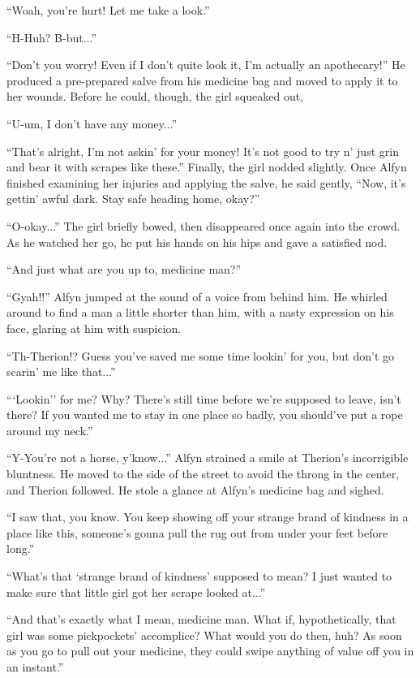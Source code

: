 ``Woah, you're hurt! Let me take a look.''

``H-Huh? B-but...''

``Don't you worry! Even if I don't quite look it, I'm actually an apothecary!'' He produced a pre-prepared salve from his medicine bag and moved to apply it to her wounds. Before he could, though, the girl squeaked out,

``U-um, I don't have any money...''

``That's alright, I'm not askin' for your money! It's not good to try n' just grin and bear it with scrapes like these.'' Finally, the girl nodded slightly. Once Alfyn finished examining her injuries and applying the salve, he said gently, ``Now, it's gettin' awful dark. Stay safe heading home, okay?''

``O-okay...'' The girl briefly bowed, then disappeared once again into the crowd. As he watched her go, he put his hands on his hips and gave a satisfied nod.

``And just what are you up to, medicine man?''

``Gyah!!'' Alfyn jumped at the sound of a voice from behind him. He whirled around to find a man a little shorter than him, with a nasty expression on his face, glaring at him with suspicion.

``Th-Therion!? Guess you've saved me some time lookin' for you, but don't go scarin' me like that...''

```Lookin'' for me? Why? There's still time before we're supposed to leave, isn't there? If you wanted me to stay in one place so badly, you should've put a rope around my neck.''

``Y-You're not a horse, y'know...'' Alfyn strained a smile at Therion's incorrigible bluntness. He moved to the side of the street to avoid the throng in the center, and Therion followed. He stole a glance at Alfyn's medicine bag and sighed.

``I saw that, you know. You keep showing off your strange brand of kindness in a place like this, someone's gonna pull the rug out from under your feet before long.''

``What's that `strange brand of kindness' supposed to mean? I just wanted to make sure that little girl got her scrape looked at...''

``And that's exactly what I mean, medicine man. What if, hypothetically, that girl was some pickpockets' accomplice? What would you do then, huh? As soon as you go to pull out your medicine, they could swipe anything of value off you in an instant.''

